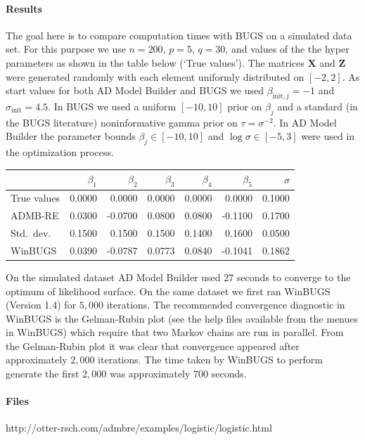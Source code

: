 \documentclass[12pt,letter,reqno]{book}
\begin{document}
\paragraph{Results}
The goal here is to compare computation times with BUGS on a simulated data set.
For this purpose we use $n=200$, $p=5$, $q=30$, and values of the the hyper
parameters as shown in the table below (`True values'). The matrices
$\mathbf{X}$ and $\mathbf{Z}$ were generated randomly with each element
uniformly distributed on $[-2,2]$. As start values for both AD Model Builder and
BUGS we used $\beta _{\mathrm{init},j}=-1$ and $\sigma_\mathrm{init}=4.5$. In
BUGS we used a uniform $[-10,10]$ prior on $\beta_j$ and a standard (in the BUGS
literature) noninformative gamma prior on $\tau=\sigma^{-2}$. In AD Model
Builder the parameter bounds $\beta_j\in[-10,10]$ and $\log\sigma\in[-5,3]$ were
used in the optimization process.
\begin{center}
  \begin{tabular}{lrrrrrr}
    \hline
    ~           & $\beta_1$ & $\beta_2$ & $\beta_3$ & $\beta_4$ & $\beta_5$ & $\sigma$\\
    \hline
    True values & 0.0000    &  0.0000   & 0.0000    & 0.0000    &  0.0000   & 0.1000  \\
    ADMB-RE     & 0.0300    & -0.0700   & 0.0800    & 0.0800    & -0.1100   & 0.1700  \\
    Std.\ dev.  & 0.1500    &  0.1500   & 0.1500    & 0.1400    &  0.1600   & 0.0500  \\
    WinBUGS     & 0.0390    & -0.0787   & 0.0773    & 0.0840    & -0.1041   & 0.1862  \\
    \hline
  \end{tabular}
\end{center}
On the simulated dataset AD Model Builder used $27$ seconds to converge to the
optimum of likelihood surface. On the same dataset we first ran WinBUGS (Version
1.4) for $5,000$ iterations. The recommended convergence diagnostic in WinBUGS
is the Gelman-Rubin plot (see the help files available from the menues in
WinBUGS) which require that two Markov chains are run in parallel. From the
Gelman-Rubin plot it was clear that convergence appeared after approximately
$2,000$ iterations. The time taken by WinBUGS to perform generate the first
$2,000$ was approximately $700$ seconds.

\paragraph{Files} http://otter-rsch.com/admbre/examples/logistic/logistic.html
\end{document}
